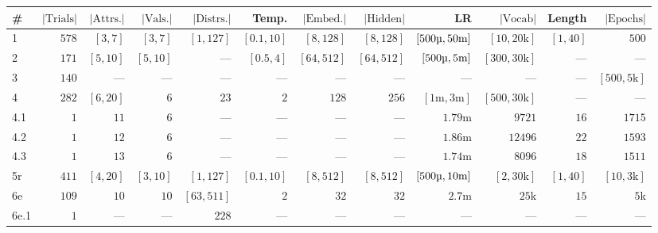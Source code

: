 \begin{table*}
  \newcommand\dit{---}
  \centering
  \footnotesize
  \setlength\tabcolsep{0.2em}
  \begin{tabular}{lrrrrrrrrrrr}
    \toprule
    \# & $|\text{Trials}|$ & $|\text{Attrs.}|$ & $|\text{Vals.}|$ & $|\text{Distrs.}|$ & Temp. & $|\text{Embed.}|$ & $|\text{Hidden}|$ & LR & $|\text{Vocab}|$ & Length & $|\text{Epochs}|$ \\
    \midrule
    1    & $578$ & $[3,7]$  &  $[3,7]$ & $[1,127]$  & $[0.1, 10]$ & $[8,128]$  & $[8,128]$  & $[500\text{\textmu},50\text{m}]$ & $[10,20\text{k}]$  & $[1,40]$ & $500$             \\
    2    & $171$ & $[5,10]$ & $[5,10]$ & \dit{}     &  $[0.5, 4]$ & $[64,512]$ & $[64,512]$ & $[500\text{\textmu},5\text{m}]$  & $[300,30\text{k}]$ & \dit{}   & \dit{}            \\
    3    & $140$ & \dit{}   &   \dit{} & \dit{}     & \dit{}      & \dit{}     & \dit{}     & \dit{}                           & \dit{}             & \dit{}   & $[500,5\text{k}]$ \\
    4    & $282$ & $[6,20]$ &      $6$ & $23$       & $2$         & $128$      & $256$      & $[1\text{m},3\text{m}]$          & $[500,30\text{k}]$ & \dit{}   & \dit{}            \\
    4.1  & $1$   & $11$     &      $6$ & \dit{}     & \dit{}      & \dit{}     & \dit{}     & $1.79\text{m}$                   & $9721$             & $16$     & $1715$            \\
    4.2  & $1$   & $12$     &      $6$ & \dit{}     & \dit{}      & \dit{}     & \dit{}     & $1.86\text{m}$                   & $12496$            & $22$     & $1593$            \\
    4.3  & $1$   & $13$     &      $6$ & \dit{}     & \dit{}      & \dit{}     & \dit{}     & $1.74\text{m}$                   & $8096$             & $18$     & $1511$            \\
    5r   & $411$ & $[4,20]$ & $[3,10]$ & $[1,127]$  & $[0.1,10]$  & $[8,512]$  & $[8,512]$  & $[500\text{\textmu},10\text{m}]$ & $[2,30\text{k}]$   & $[1,40]$ & $[10,3\text{k}]$  \\
    6e   & $109$ & $10$     &     $10$ & $[63,511]$ & $2$         & $32$       & $32$       & $2.7\text{m}$                    & $25\text{k}$       & $15$     & $5\text{k}$       \\
    6e.1 & $1$   & \dit{}   &   \dit{} & $228$      & \dit{}      & \dit{}     & \dit{}     & \dit{}                           & \dit{}             & \dit{}   & \dit{}            \\

\end{tabular}
\end{table*}
